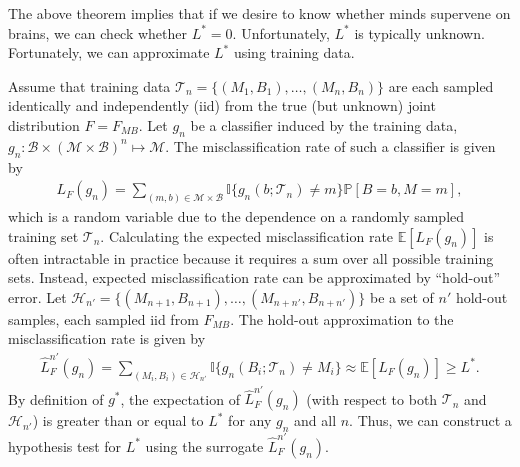 \documentclass{article}
\newcommand{\PP}{\mathbb{P}}
\newcommand{\EE}{\mathbb{E}}           %
\newcommand{\II}{\mathbb{I}}           %
\providecommand{\mc}[1]{\mathcal{#1}}
\newcommand{\mB}{\mathcal{B}}
\newcommand{\mM}{\mathcal{M}}
\newcommand{\hL}{\widehat{L}}
\begin{document}

The above theorem implies that if we desire to know whether  minds supervene on brains, we can check whether $L^*=0$.  Unfortunately, $L^*$ is typically unknown.  Fortunately, we can approximate $L^*$ using training data.

Assume that training data $\mc{T}_n=\{(M_{1},B_{1}), \ldots, (M_{n},B_{n})\}$ are each sampled identically and independently (iid) from the true (but unknown) joint distribution $F=F_{MB}$.  Let $g_n$ be a classifier induced by the training data, $g_n:\mB \times (\mc{M} \times \mc{B})^n \mapsto \mM$.  The  misclassification rate of such a classifier is given by
\begin{align}
L_F(g_n)=\sum_{(m,b)  \in \mc{M}\times \mc{B}} \II\{g_n(b; \mc{T}_n) \neq m\} \PP[B=b,M=m],
\end{align}
which is a random variable due to the dependence on a randomly sampled training set $\mc{T}_n$.  
Calculating the expected misclassification rate $\EE[L_F(g_n)]$ is often intractable in practice because it requires a sum over all possible training sets.  Instead, expected misclassification rate can be approximated by ``hold-out'' error.  Let $\mc{H}_{n'}=\{(M_{n+1},B_{n+1}), \ldots, (M_{n+n'},B_{n+n'})\}$ be a set of $n'$ hold-out samples, each sampled iid from $F_{MB}$.  The hold-out approximation to the misclassification rate is given by
\begin{align}
\hL^{n'}_{F}(g_{n}) = \sum_{(M_i,B_i) \in \mc{H}_{n'}}\II \{g_{n}(B_i; \mc{T}_{n})\neq M_i\} \approx \EE[L_F(g_n)] \geq L^*. %
\end{align}
By definition of $g^*$, the expectation of $\hL^{n'}_F(g_n)$ (with respect to both $\mc{T}_n$ and $\mc{H}_{n'}$)  is greater than or equal to $L^*$ for any $g_n$ and all $n$.  Thus, we can construct a hypothesis test for $L^*$ using the surrogate $\hL^{n'}_F(g_n)$.  
\end{document}

